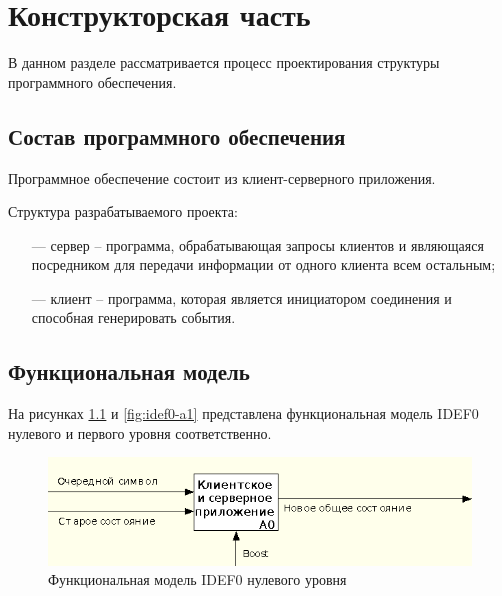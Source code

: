 \chapter{Конструкторская часть}

В данном разделе рассматривается процесс проектирования структуры программного обеспечения.

\section{Состав программного обеспечения}

Программное обеспечение состоит из клиент-серверного приложения.

Структура разрабатываемого проекта:

\begin{itemize}
	\item[---] сервер -- программа, обрабатывающая запросы клиентов и являющаяся посредником для передачи информации от одного клиента всем остальным;
	\item[---] клиент -- программа, которая является инициатором соединения и способная генерировать события.
\end{itemize}

\section{Функциональная модель}

На рисунках \ref{fig:idef0-a0} и \ref{fig:idef0-a1} представлена функциональная модель IDEF0 нулевого и первого уровня соответственно.

\begin{center}
	\begin{figure}[H]
		\begin{center}
			\includegraphics[scale=0.7]{img/idef0-a0.png}
		\end{center}
		\caption{\label{fig:idef0-a0} Функциональная модель IDEF0 нулевого уровня}
	\end{figure}
\end{center}

